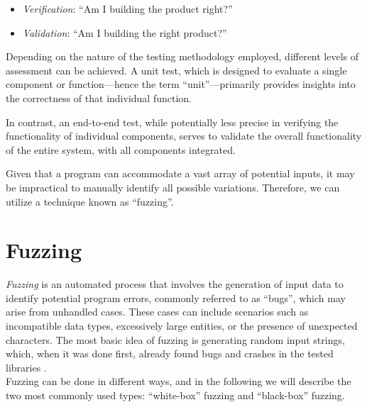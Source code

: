 \begin{itemize}[label={}]
    \item \textit{Verification}: “Am I building the product right?” 
    \item \textit{Validation}: “Am I building the right product?”
\end{itemize}
Depending on the nature of the testing methodology employed, different levels of  assessment can be achieved. A unit test, which is designed to evaluate a single component or function—hence the term “unit”—primarily provides insights into the correctness of that individual function. \cite{beck_test-driven_2003}

In contrast, an end-to-end test, while potentially less precise in verifying the functionality of individual components, serves to validate the overall functionality of the entire system, with all components integrated. \cite{paul_end--end_2001}

Given that a program can accommodate a vast array of potential inputs, it may be impractical to manually identify all possible variations. Therefore, we can utilize a technique known as “fuzzing”.

\section{Fuzzing}
\label{sec:fuzzing}
\textit{Fuzzing} is an automated process that involves the generation of input data to identify potential program errors, commonly referred to as “bugs”, which may arise from unhandled cases. These cases can include scenarios such as incompatible data types, excessively large entities, or the presence of unexpected characters.
The most basic idea of fuzzing is generating random input strings, which, when it was done first, already found bugs and crashes in the tested libraries \cite{miller_empirical_1990}.\\
Fuzzing can be done in different ways, and in the following we will describe the two most commonly used types: “white-box” fuzzing and “black-box” fuzzing.


